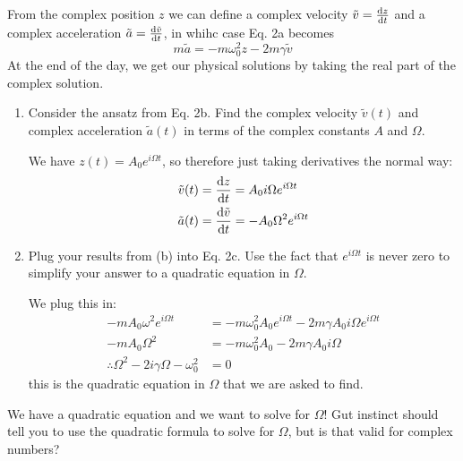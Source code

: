 \documentclass[10pt]{article}
\begin{document}
	 From the complex position $z$ we can define a complex velocity $\tilde v = \dv{z}{t}$ and a complex 
	 acceleration $\tilde a = \dv{\tilde v}{t}$, in whihc case Eq. 2a becomes 
	 \[
	 m\tilde a = -m \omega_0^2 z - 2m \gamma \tilde v
	 \] 
	 At the end of the day, we get our physical solutions by taking the real part of the complex solution.

	 \begin{enumerate}[label=\alph*), resume]
	 	\item Consider the ansatz from Eq. 2b. Find the complex velocity $\tilde v(t)$ and complex acceleration 
			$\tilde a(t)$ in terms of the complex constants $A$ and $\Omega$. 

			\begin{solution}
				We have $z(t) = A_0e^{i \Omega t}$, so therefore just taking derivatives the normal way:
				\begin{align*}
					\tilde v(t) &= \dv{z}{t} = A_0i \Omega e^{i \Omega t}\\
					\tilde a(t) &= \dv{\tilde v}{t} = -A_0\Omega^2 e^{i \Omega t}
				\end{align*}
			\end{solution}
		\item Plug your results from (b) into Eq. 2c. Use the fact that $e^{i \Omega t}$ is never zero to 
			simplify your answer to a quadratic equation in $\Omega$. 

			\begin{solution}
				We plug this in:
				\begin{align*}
					-mA_0\omega^2 e^{i \Omega t} &= -m \omega_0^2 A_0e^{i \Omega t} - 2m \gamma A_0i \Omega 
					e^{i \Omega t}\\
					-mA_0\Omega^2 &= -m\omega_0^2 A_0 - 2m\gamma A_0 i \Omega \\
					\therefore \Omega^2 - 2i\gamma \Omega - \omega_0^2 &= 0
				\end{align*}
				this is the quadratic equation in $\Omega$ that we are asked to find.
			\end{solution}
	 \end{enumerate}
	 We have a quadratic equation and we want to solve for $\Omega$! Gut instinct should tell you to use the
	 quadratic formula to solve for $\Omega$, but is that valid for complex numbers?
\end{document}
